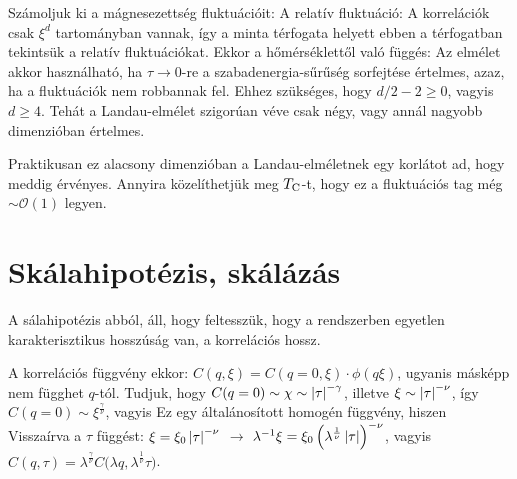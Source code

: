   Számoljuk ki a mágnesezettség fluktuációit:
  A relatív fluktuáció:
  A korrelációk csak $\xi^d$ tartományban vannak, így a minta térfogata helyett ebben a térfogatban tekintsük a relatív fluktuációkat. Ekkor a hőmérséklettől való függés:
  Az elmélet akkor használható, ha $\tau\to 0$-re a szabadenergia-sűrűség sorfejtése értelmes, azaz, ha a fluktuációk nem robbannak fel. Ehhez szükséges, hogy $d/2-2\ge 0$, vagyis $d\ge 4$. Tehát a Landau-elmélet szigorúan véve csak négy, vagy annál nagyobb dimenzióban értelmes.
  
  Praktikusan ez alacsony dimenzióban a Landau-elméletnek egy korlátot ad, hogy meddig érvényes. Annyira közelíthetjük meg $T_\text{C}$-t, hogy ez a fluktuációs tag még $\sim\mathcal{O}(1)$ legyen.
  
 \section{Skálahipotézis, skálázás}
  
  A sálahipotézis abból, áll, hogy feltesszük, hogy a rendszerben egyetlen karakterisztikus hosszúság van, a korrelációs hossz. 
  
  A korrelációs függvény ekkor: $C(q,\xi)=C(q=0,\xi)\cdot\phi(q\xi)$, ugyanis másképp nem függhet $q$-tól. Tudjuk, hogy $C(q=0)\sim\chi\sim\left\lvert\tau\right\rvert^{-\gamma}$, illetve $\xi\sim\left\lvert\tau\right\rvert^{-{\nu}}$, így $C(q=0)\sim\xi^{\frac{\gamma}{\nu}}$, vagyis
  Ez egy általánosított homogén függvény, hiszen
  Visszaírva a $\tau$ függést: $\xi=\xi_0\left\lvert\tau\right\rvert^{-\nu}$ $\rightarrow$ $\lambda^{-1}\xi=\xi_0\left(\lambda^{\frac{1}{\nu}}\left\lvert\tau\right\rvert\right)^{-\nu}$, vagyis $C(q,\tau)=\lambda^{\frac{\gamma}{\nu}}C\big(\lambda q,\lambda^{\frac{1}{\nu}}\tau\big)$. 
  
